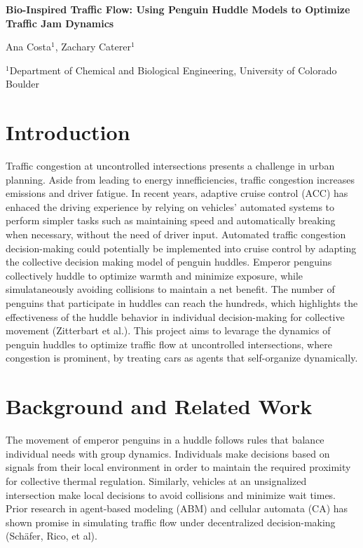 \documentclass[10pt]{article}
\begin{document}
\begin{center}    
    \textbf{\Large 
    Bio-Inspired Traffic Flow: Using Penguin Huddle Models to Optimize Traffic Jam Dynamics
    }\\
    
    \vspace{0.5cm}

    Ana Costa$^1$, Zachary Caterer$^1$\\
    
    \vspace{0.5cm}
    
    $^1$Department of Chemical and Biological Engineering, University of Colorado Boulder\\
\end{center}


\section*{Introduction}
    Traffic congestion at uncontrolled intersections presents a challenge in urban planning. Aside from leading to energy innefficiencies, traffic congestion
increases emissions and driver fatigue. In recent years, adaptive cruise control (ACC) has enhaced the driving experience by relying on vehicles' automated
systems to perform simpler tasks such as maintaining speed and automatically breaking when necessary, without the need of driver input. Automated traffic congestion decision-making could
potentially be implemented into cruise control by adapting the collective decision making model of penguin huddles. Emperor penguins collectively huddle to optimize warmth and minimize exposure, while
simulataneously avoiding collisions to maintain a net benefit. The number of penguins that participate in huddles can reach the hundreds, which highlights
the effectiveness of the huddle behavior in individual decision-making for collective movement (Zitterbart et al.). This project aims to levarage the dynamics of penguin huddles to optimize traffic flow at uncontrolled intersections,
where congestion is prominent, by treating cars as agents that self-organize dynamically. 

\section*{Background and Related Work}
    The movement of emperor penguins in a huddle follows rules that balance individual needs with group dynamics. Individuals make decisions based on signals from their local
environment in order to maintain the required proximity for collective thermal regulation. Similarly, vehicles at an unsignalized intersection make local decisions to avoid 
collisions and minimize wait times. Prior research in agent-based modeling (ABM) and cellular automata (CA) has shown promise in simulating traffic flow under decentralized decision-making (Schäfer, Rico, et al).
\end{document}
